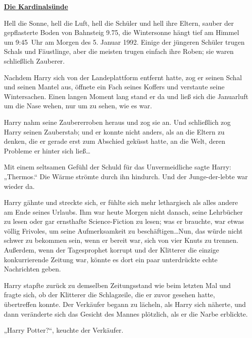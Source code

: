 

\hypertarget{die-kardinalsuxfcnde}{%

\textbf{\uline{Die Kardinalsünde}}

Hell die Sonne, hell die Luft, hell die Schüler und hell ihre Eltern, sauber der gepflasterte Boden von Bahnsteig 9.75, die Wintersonne hängt tief am Himmel um 9:45~Uhr am Morgen des 5. Januar 1992. Einige der jüngeren Schüler trugen Schals und Fäustlinge, aber die meisten trugen einfach ihre Roben; sie waren schließlich Zauberer.

Nachdem Harry sich von der Landeplattform entfernt hatte, zog er seinen Schal und seinen Mantel aus, öffnete ein Fach seines Koffers und verstaute seine Wintersachen. Einen langen Moment lang stand er da und ließ sich die Januarluft um die Nase wehen, nur um zu sehen, wie es war.

Harry nahm seine Zaubererroben heraus und zog sie an. Und schließlich zog Harry seinen Zauberstab; und er konnte nicht anders, als an die Eltern zu denken, die er gerade erst zum Abschied geküsst hatte, an die Welt, deren Probleme er hinter sich ließ…

Mit einem seltsamen Gefühl der Schuld für das Unvermeidliche sagte Harry: „Thermos.“ Die Wärme strömte durch ihn hindurch. Und der Junge-der-lebte war wieder da.

Harry gähnte und streckte sich, er fühlte sich mehr lethargisch als alles andere am Ende seines Urlaubs. Ihm war heute Morgen nicht danach, seine Lehrbücher zu lesen oder gar ernsthafte Science-Fiction zu lesen; was er brauchte, war etwas völlig Frivoles, um seine Aufmerksamkeit zu beschäftigen…Nun, das würde nicht schwer zu bekommen sein, wenn er bereit war, sich von vier Knuts zu trennen. Außerdem, wenn der Tagesprophet korrupt und der Klitterer die einzige konkurrierende Zeitung war, könnte es dort ein paar unterdrückte echte Nachrichten geben.

Harry stapfte zurück zu demselben Zeitungsstand wie beim letzten Mal und fragte sich, ob der Klitterer die Schlagzeile, die er zuvor gesehen hatte, übertreffen konnte. Der Verkäufer begann zu lächeln, als Harry sich näherte, und dann veränderte sich das Gesicht des Mannes plötzlich, als er die Narbe erblickte.

„Harry Potter?“, keuchte der Verkäufer.

}
